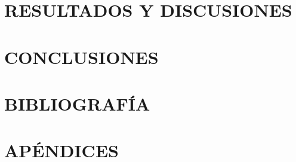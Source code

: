\documentclass[10pt]{article}
\begin{document}
\section{RESULTADOS Y DISCUSIONES}






\newpage
\setcounter{equation}{0} %
\setcounter{figure}{0} %
\setcounter{table}{0} %
\section{CONCLUSIONES}






\newpage
\setcounter{equation}{0} %
\setcounter{figure}{0} %
\setcounter{table}{0} %
\section{BIBLIOGRAFÍA}
\printbibliography[heading=none]

\newpage
\pagestyle{empty} %
\setcounter{equation}{0} %
\setcounter{figure}{0} %
\setcounter{table}{0} %
\renewcommand{\thesubsection}{APÉNDICE \Alph{subsection}:}                            %
\renewcommand{\thesubsubsection}{\Alph{subsection}.\arabic{subsubsection}:}       %
\renewcommand{\theequation}{.\Alph{subsection}\arabic{equation}} %
\renewcommand{\thefigure}{\Alph{subsection}.\arabic{figure}} %
\renewcommand{\thetable}{\Alph{subsection}.\arabic{table}} %

\section*{APÉNDICES}


\end{document}
